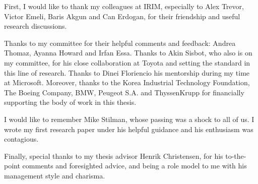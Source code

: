 \begin{acknowledgements}

First, I would like to thank my colleagues at IRIM, especially to Alex Trevor, Victor Emeli, Baris Akgun and Can Erdogan, for their friendship and useful research discussions.

Thanks to my committee for their helpful comments and feedback: Andrea Thomaz, Ayanna Howard and Irfan Essa. Thanks to Akin Sisbot, who also is on my committee, for his close collaboration at Toyota and setting the standard in this line of research. Thanks to Dinei Floriencio his mentorship during my time at Microsoft. Moreover, thanks to the Korea Industrial Technology Foundation, The Boeing Company, BMW, Peugeot S.A. and ThyssenKrupp for financially supporting the body of work in this thesis.

I would like to remember Mike Stilman, whose passing was a shock to all of us. I wrote my first research paper under his helpful guidance and his enthusiasm was contagious.

Finally, special thanks to my thesis advisor Henrik Christensen, for his to-the-point comments and foresighted advice, and being a role model to me with his management style and charisma.

\end{acknowledgements}